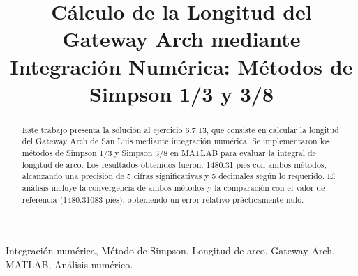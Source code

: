 \documentclass[conference]{IEEEtran}
\begin{document}
\title{Cálculo de la Longitud del Gateway Arch mediante Integración Numérica: Métodos de Simpson 1/3 y 3/8}

\author{
\and
{}
\and
{}
\and
\IEEEauthorblockN{}
\IEEEauthorblockA{}
\and
{}
\and
\IEEEauthorblockN{}
\IEEEauthorblockA{}
}

\maketitle

\begin{abstract}
Este trabajo presenta la solución al ejercicio 6.7.13, que consiste en calcular la longitud del Gateway Arch de San Luis mediante integración numérica. Se implementaron los métodos de Simpson 1/3 y Simpson 3/8 en MATLAB para evaluar la integral de longitud de arco. Los resultados obtenidos fueron: 1480.31 pies con ambos métodos, alcanzando una precisión de 5 cifras significativas y 5 decimales según lo requerido. El análisis incluye la convergencia de ambos métodos y la comparación con el valor de referencia (1480.31083 pies), obteniendo un error relativo prácticamente nulo.
\end{abstract}

\begin{IEEEkeywords}
Integración numérica, Método de Simpson, Longitud de arco, Gateway Arch, MATLAB, Análisis numérico.
\end{IEEEkeywords}
\end{document}
